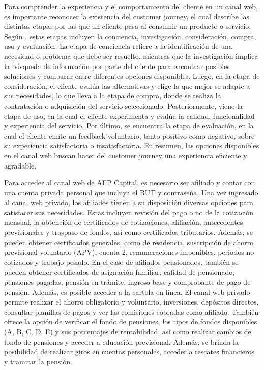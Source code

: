 Para comprender la experiencia y el comportamiento del cliente en un canal web, es importante reconocer la existencia del customer journey, el cual describe las distintas etapas por las que un cliente pasa al consumir un producto o servicio. Según \cite{lemon2016customer}, estas etapas incluyen la conciencia, investigación, consideración, compra, uso y evaluación. La etapa de conciencia refiere a la identificación de una necesidad o problema que debe ser resuelto, mientras que la investigación implica la búsqueda de información por parte del cliente para encontrar posibles soluciones y comparar entre diferentes opciones disponibles. Luego, en la etapa de consideración, el cliente evalúa las alternativas y elige la que mejor se adapte a sus necesidades, lo que lleva a la etapa de compra, donde se realiza la contratación o adquisición del servicio seleccionado. Posteriormente, viene la etapa de uso, en la cual el cliente experimenta y evalúa la calidad, funcionalidad y experiencia del servicio. Por último, se encuentra la etapa de evaluación, en la cual el cliente emite un feedback voluntario, tanto positivo como negativo, sobre su experiencia satisfactoria o insatisfactoria. En resumen, las opciones disponibles en el canal web buscan hacer del customer journey una experiencia eficiente y agradable.

Para acceder al canal web de AFP Capital, es necesario ser afiliado y contar con una cuenta privada personal que incluya el RUT y contraseña. Una vez ingresado al canal web privado, los afiliados tienen a su disposición diversas opciones para satisfacer sus necesidades. Estas incluyen revisión del pago o no de la cotización mensual, la obtención de certificados de cotizaciones, afiliación, antecedentes previsionales y traspaso de fondos, así como certificados tributarios. Además, se pueden obtener certificados generales, como de residencia, suscripción de ahorro previsional voluntario (APV), cuenta 2, remuneraciones imponibles, periodos no cotizados y trabajo pesado. En el caso de afiliados pensionados, también se pueden obtener certificados de asignación familiar, calidad de pensionado, pensiones pagadas, pensión en trámite, ingreso base y comprobante de pago de pensión. Además, es posible acceder a la cartola en línea. El canal web privado permite realizar el ahorro obligatorio y voluntario, inversiones, depósitos directos, consultar planillas de pagos y ver las comisiones cobradas como afiliado. También ofrece la opción de verificar el fondo de pensiones, los tipos de fondos disponibles (A, B, C, D, E) y sus porcentajes de rentabilidad, así como realizar cambios de fondo de pensiones y acceder a educación previsional. Además, se brinda la posibilidad de realizar giros en cuentas personales, acceder a rescates financieros y tramitar la pensión.